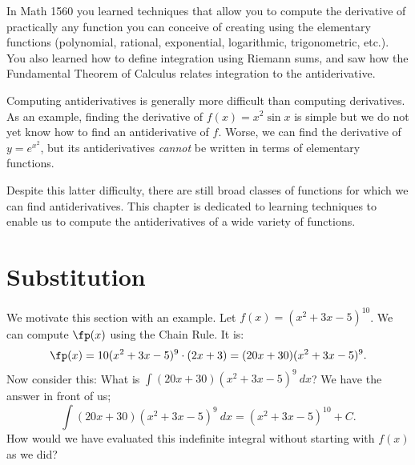 In Math 1560 you learned techniques that allow you to compute the derivative of practically any function you can conceive of creating using the elementary functions (polynomial, rational, exponential, logarithmic, trigonometric, etc.). You also learned how to define integration using Riemann sums, and saw how the Fundamental Theorem of Calculus relates integration to the antiderivative.

Computing antiderivatives is generally more difficult than computing derivatives. As an example, finding the derivative of $f(x) = x^2\sin x$ is simple but we do not yet know how to find an antiderivative of $f$. Worse, we can find the derivative of $y=e^{x^2}$, but its antiderivatives \textit{cannot} be written in terms of elementary functions.

Despite this latter difficulty, there are still broad classes of functions for which we can find antiderivatives. This chapter is dedicated to learning techniques to enable us to compute the antiderivatives of a wide variety of functions.




\section{Substitution}\label{sec:substitution}

We motivate this section with an example. Let $f(x) = (x^2+3x-5)^{10}$. We can compute $\fp(x)$ using the Chain Rule. It is:
	$$\fp(x) = 10(x^2+3x-5)^9\cdot(2x+3) = (20x+30)(x^2+3x-5)^9.$$
Now consider this: What is $\int (20x+30)(x^2+3x-5)^9\ dx$? We have the answer in front of us; $$\int (20x+30)(x^2+3x-5)^9\ dx = (x^2+3x-5)^{10}+C.$$
How would we have evaluated this indefinite integral without starting with $f(x)$ as we did?

